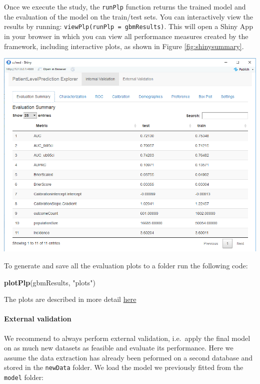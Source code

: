 \documentclass[11pt]{book}
\newenvironment{Shaded}{\begin{snugshade}}{\end{snugshade}}
\newcommand{\KeywordTok}[1]{\textcolor[rgb]{0.13,0.29,0.53}{\textbf{#1}}}
\newcommand{\NormalTok}[1]{#1}
\newcommand{\StringTok}[1]{\textcolor[rgb]{0.31,0.60,0.02}{#1}}
\let\oldparagraph\paragraph
\renewcommand{\paragraph}[1]{\oldparagraph{#1}\mbox{}}
\theoremstyle{definition}
\theoremstyle{definition}
\theoremstyle{definition}
\theoremstyle{remark}
\begin{document}
Once we execute the study, the \texttt{runPlp} function returns the trained model and the evaluation of the model on the train/test sets. You can interactively view the results by running: \texttt{viewPlp(runPlp\ =\ gbmResults)}. This will open a Shiny App in your browser in which you can view all performance measures created by the framework, including interactive plots, as shown in Figure \ref{fig:shinysummary}.

\includegraphics[width=1\linewidth]{images/PatientLevelPrediction/shinysummary}

To generate and save all the evaluation plots to a folder run the following code:

\begin{Shaded}
\begin{Highlighting}[]
\KeywordTok{plotPlp}\NormalTok{(gbmResults, }\StringTok{"plots"}\NormalTok{)}
\end{Highlighting}
\end{Shaded}

The plots are described in more detail \protect\hyperlink{performance}{here}

\hypertarget{external-validation}{%
\paragraph{External validation}\label{external-validation}}

We recommend to always perform external validation, i.e.~apply the final model on as much new datasets as feasible and evaluate its performance. Here we assume the data extraction has already been peformed on a second database and stored in the \texttt{newData} folder. We load the model we previously fitted from the \texttt{model} folder:
\end{document}
